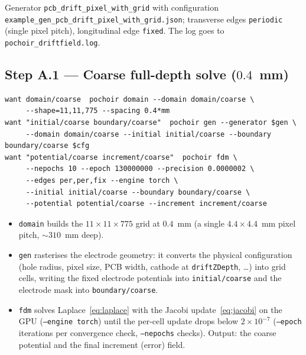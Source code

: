 \documentclass[11pt]{article}
\newcommand{\key}[1]{\texttt{#1}}
\newcommand{\cmd}[1]{\texttt{#1}}
\begin{document}
Generator \cmd{pcb\_drift\_pixel\_with\_grid} with configuration
\cmd{example\_gen\_pcb\_drift\_pixel\_with\_grid.json}; transverse edges
\texttt{periodic} (single pixel pitch), longitudinal edge \texttt{fixed}.
The log goes to \texttt{pochoir\_driftfield.log}.

\subsection*{Step A.1 --- Coarse full-depth solve ($0.4$~mm)}
\begin{lstlisting}
want domain/coarse  pochoir domain --domain domain/coarse \
     --shape=11,11,775 --spacing 0.4*mm
want "initial/coarse boundary/coarse"  pochoir gen --generator $gen \
     --domain domain/coarse --initial initial/coarse --boundary boundary/coarse $cfg
want "potential/coarse increment/coarse"  pochoir fdm \
     --nepochs 10 --epoch 130000000 --precision 0.0000002 \
     --edges per,per,fix --engine torch \
     --initial initial/coarse --boundary boundary/coarse \
     --potential potential/coarse --increment increment/coarse
\end{lstlisting}
\begin{itemize}
  \item \cmd{domain} builds the $11\times11\times775$ grid at $0.4$~mm
        (a single $4.4\times4.4$~mm pixel pitch, $\sim310$~mm deep).
  \item \cmd{gen} rasterises the electrode geometry: it converts the
        physical configuration (hole radius, pixel size, PCB width,
        cathode at \texttt{driftZDepth}, \ldots) into grid cells, writing
        the fixed electrode potentials into \key{initial/coarse} and the
        electrode mask into \key{boundary/coarse}.
  \item \cmd{fdm} solves Laplace~\eqref{eq:laplace} with the Jacobi
        update~\eqref{eq:jacobi} on the GPU (\texttt{--engine torch}) until
        the per-cell update drops below $2\times10^{-7}$
        (\texttt{--epoch} iterations per convergence check,
        \texttt{--nepochs} checks).  Output: the coarse potential and the
        final increment (error) field.
\end{itemize}
\end{document}
